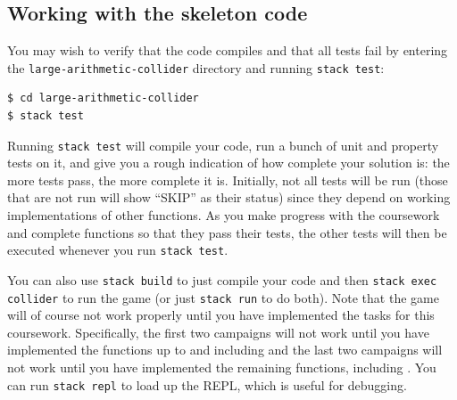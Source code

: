 \subsection{Working with the skeleton code}

You may wish to verify that the code compiles and that all tests fail by entering the \texttt{\small large-arithmetic-collider} directory and running \texttt{\small stack test}:
\begin{verbatim}
$ cd large-arithmetic-collider
$ stack test
\end{verbatim}
Running \texttt{\small stack test} will compile your code, run a bunch of unit and property tests on it, and give you a rough indication of how complete your solution is: the more tests pass, the more complete it is. Initially, not all tests will be run (those that are not run will show ``SKIP'' as their status) since they depend on working implementations of other functions. As you make progress with the coursework and complete functions so that they pass their tests, the other tests will then be executed whenever you run \texttt{\small stack test}. %

You can also use \texttt{\small stack build} to just compile your code and then \texttt{\small stack exec collider} to run the game (or just \texttt{\small stack run} to do both). Note that the game will of course not work properly until you have implemented the tasks for this coursework. Specifically, the first two campaigns will not work until you have implemented the functions up to and including  and the last two campaigns will not work until you have implemented the remaining functions, including . You can run \texttt{\small stack repl} to load up the REPL, which is useful for debugging.

